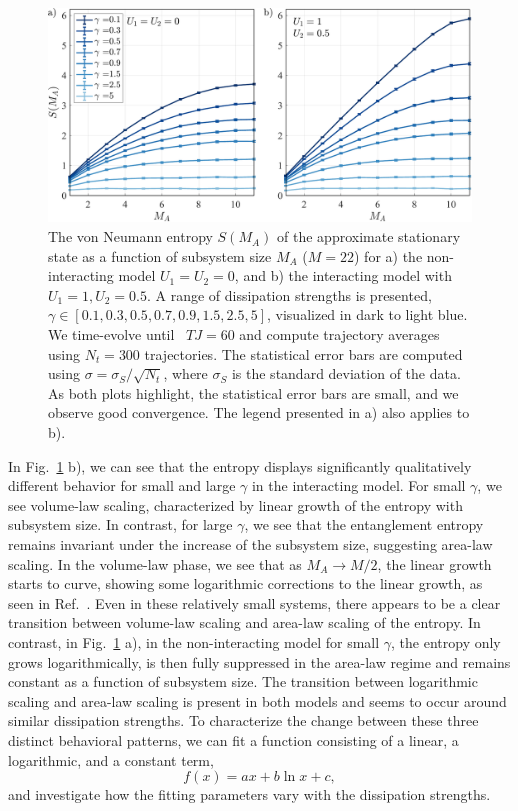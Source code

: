     \begin{figure}[ht]
        \centering
        \includegraphics[width=\textwidth]{Chapters/Plots/Chapter4/Chapter3_Fig2.pdf}
        \caption{The von Neumann entropy $S(M_A)$ of the approximate stationary state as a function of subsystem size $M_A$ ($M=22$) for a) the non-interacting model $U_1 = U_2 = 0$, and b) the interacting model with $U_1 = 1, U_2 = 0.5$. A range of dissipation strengths is presented, $\gamma \in [0.1,0.3,0.5,0.7,0.9,1.5,2.5,5]$, visualized in dark to light blue. We time-evolve until ~$TJ = 60$ and compute trajectory averages using $N_t = 300$ trajectories. The statistical error bars are computed using $\sigma = \sigma_S / \sqrt{N_t}$, where $\sigma_S$ is the standard deviation of the data. As both plots highlight, the statistical error bars are small, and we observe good convergence. The legend presented in a) also applies to b).}
        \label{fig:Chapter3_Fig2}
    \end{figure}

In Fig.~\ref{fig:Chapter3_Fig2} b), we can see that the entropy displays significantly qualitatively different behavior for small and large $\gamma$ in the interacting model. For small $\gamma$, we see volume-law scaling, characterized by linear growth of the entropy with subsystem size. In contrast, for large $\gamma$, we see that the entanglement entropy remains invariant under the increase of the subsystem size, suggesting area-law scaling. In the volume-law phase, we see that as $M_A \to M/2$, the linear growth starts to curve, showing some logarithmic corrections to the linear growth, as seen in Ref.~\cite{fuji2020}. Even in these relatively small systems, there appears to be a clear transition between volume-law scaling and area-law scaling of the entropy. In contrast, in Fig.~\ref{fig:Chapter3_Fig2} a), in the non-interacting model for small $\gamma$, the entropy only grows logarithmically, is then fully suppressed in the area-law regime and remains constant as a function of subsystem size. The transition between logarithmic scaling and area-law scaling is present in both models and seems to occur around similar dissipation strengths. To characterize the change between these three distinct behavioral patterns, we can fit a function consisting of a linear, a logarithmic, and a constant term,
\begin{equation}
    f(x) = a x + b \ln{x} + c,
\end{equation}
and investigate how the fitting parameters vary with the dissipation strengths. 

